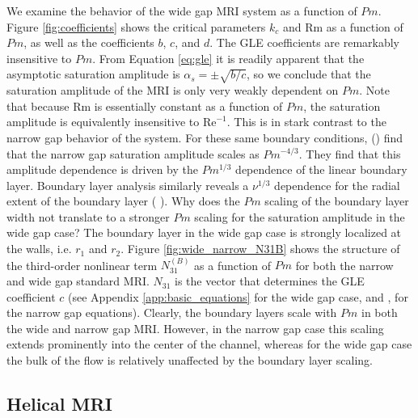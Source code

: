\documentclass{emulateapj}
\newcommand{\citei}[1]{\citeauthor{#1} \citeyear{#1}}
\newcommand\reye{\mathrm{Re}}
\newcommand\reym{\mathrm{Rm}}
\begin{document}
We examine the behavior of the wide gap MRI system as a function of $Pm$. Figure \ref{fig:coefficients} shows the critical parameters $k_c$ and $\reym$ as a function of $Pm$, as well as the coefficients $b$, $c$, and $d$. The GLE coefficients are remarkably insensitive to $Pm$. From Equation \ref{eq:gle} it is readily apparent that the asymptotic saturation amplitude is $\alpha_{s} = \pm \sqrt{b/c}$, so we conclude that the saturation amplitude of the MRI is only very weakly dependent on $Pm$. Note that because $\reym$ is essentially constant as a function of $Pm$, the saturation amplitude is equivalently insensitive to $\reye^{-1}$. This is in stark contrast to the narrow gap behavior of the system. For these same boundary conditions, \citeauthor{Umurhan:2007hs} (\citeyear{Umurhan:2007hs}) find that the narrow gap saturation amplitude scales as $Pm^{-4/3}$. They find that this amplitude dependence is driven by the $Pm^{1/3}$ dependence of the linear boundary layer. Boundary layer analysis similarly reveals a $\nu^{1/3}$ dependence for the radial extent of the boundary layer (\citei{Goodman:2002ix}). Why does the $Pm$ scaling of the boundary layer width not translate to a stronger $Pm$ scaling for the saturation amplitude in the wide gap case? The boundary layer in the wide gap case is strongly localized at the walls, i.e. $r_1$ and $r_2$. Figure \ref{fig:wide_narrow_N31B} shows the structure of the third-order nonlinear term $N_{31}^{(B)}$ as a function of $Pm$ for both the narrow and wide gap standard MRI. $N_{31}$ is the vector that determines the GLE coefficient $c$ (see Appendix \ref{app:basic_equations} for the wide gap case, and \citei{Umurhan:2007hs}, \citei{Clark:2016} for the narrow gap equations). Clearly, the boundary layers scale with $Pm$ in both the wide and narrow gap MRI. However, in the narrow gap case this scaling extends prominently into the center of the channel, whereas for the wide gap case the bulk of the flow is relatively unaffected by the boundary layer scaling. 


\subsection{Helical MRI}
\end{document}
